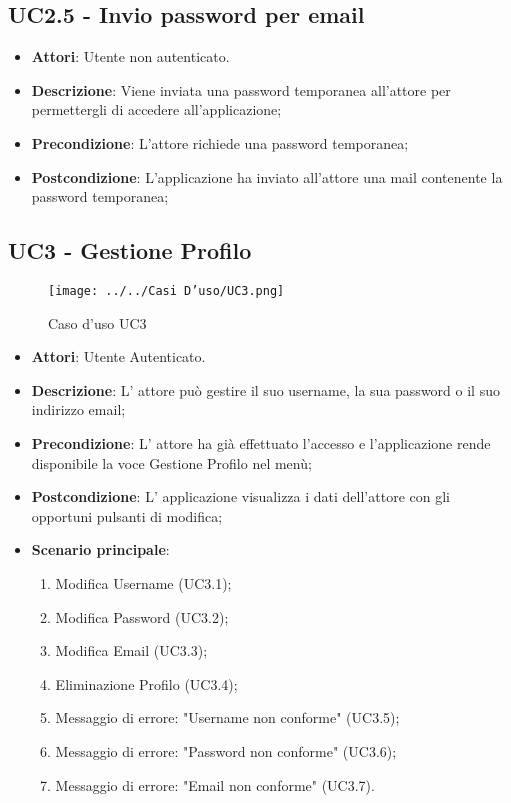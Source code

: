 \subsection{UC2.5 - Invio password per email} 
\label{ssec:UC2.5} 
\begin{itemize} 
\item \textbf{Attori}: Utente non autenticato.
\item \textbf{Descrizione}: Viene inviata una password temporanea all'attore per permettergli di accedere all'applicazione;
\item \textbf{Precondizione}: L'attore richiede una password temporanea;
\item \textbf{Postcondizione}: L'applicazione ha inviato all'attore una mail contenente la password temporanea;
\end{itemize} 
\subsection{UC3 - Gestione Profilo} 
\label{ssec:UC3} 
\begin{figure}[h!] 
\centering 
\texttt{[image: ../../Casi D'uso/UC3.png]} 
\caption{Caso d'uso UC3} 
 \end{figure} 
\begin{itemize} 
\item \textbf{Attori}: Utente Autenticato.
\item \textbf{Descrizione}: L' attore può gestire il suo username, la sua password o il suo indirizzo email;
\item \textbf{Precondizione}: L' attore ha già effettuato l'accesso e l'applicazione rende disponibile la voce Gestione Profilo nel menù;
\item \textbf{Postcondizione}: L' applicazione visualizza i dati dell'attore con gli opportuni pulsanti di modifica;
\item \textbf{Scenario principale}: \begin{enumerate}\item Modifica Username (UC3.1);\item Modifica Password (UC3.2);\item Modifica Email (UC3.3);\item Eliminazione Profilo (UC3.4);\item Messaggio di errore: "Username non conforme" (UC3.5);\item Messaggio di errore: "Password non conforme" (UC3.6);\item Messaggio di errore: "Email non conforme" (UC3.7). 
 \end{enumerate}
\end{itemize} 
